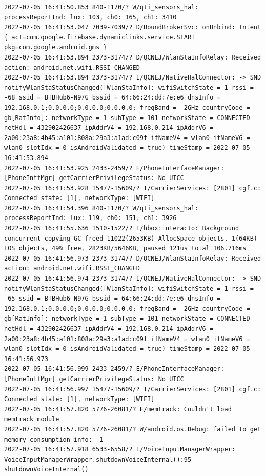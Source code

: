 \documentclass[a4paper,12pt]{book}
\begin{document}
\begin{lstlisting}
2022-07-05 16:41:50.853 840-1170/? W/qti_sensors_hal: processReportInd: lux: 103, ch0: 165, ch1: 3410
2022-07-05 16:41:53.047 7039-7039/? D/BoundBrokerSvc: onUnbind: Intent { act=com.google.firebase.dynamiclinks.service.START pkg=com.google.android.gms }
2022-07-05 16:41:53.894 2373-3174/? D/QCNEJ/WlanStaInfoRelay: Received action: android.net.wifi.RSSI_CHANGED
2022-07-05 16:41:53.894 2373-3174/? I/QCNEJ/NativeHalConnector: -> SND notifyWlanStaStatusChanged([WlanStaInfo]: wifiSwitchState = 1 rssi = -68 ssid = BTBHub6-N97G bssid = 64:66:24:dd:7e:e6 dnsInfo = 192.168.0.1;0.0.0.0;0.0.0.0;0.0.0.0; freqBand = _2GHz countryCode = gb[RatInfo]: networkType = 1 subType = 101 networkState = CONNECTED netHdl = 432902426637 ipAddrV4 = 192.168.0.214 ipAddrV6 = 2a00:23a8:4b45:a101:808a:29a3:a1ad:c09f ifNameV4 = wlan0 ifNameV6 = wlan0 slotIdx = 0 isAndroidValidated = true) timeStamp = 2022-07-05 16:41:53.894
2022-07-05 16:41:53.925 2433-2459/? E/PhoneInterfaceManager: [PhoneIntfMgr] getCarrierPrivilegeStatus: No UICC
2022-07-05 16:41:53.928 15477-15609/? I/CarrierServices: [2801] cgf.c: Connected state: [1], networkType: [WIFI]
2022-07-05 16:41:54.396 840-1170/? W/qti_sensors_hal: processReportInd: lux: 119, ch0: 151, ch1: 3926
2022-07-05 16:41:55.636 1510-1522/? I/hbox:interacto: Background concurrent copying GC freed 11022(2653KB) AllocSpace objects, 1(64KB) LOS objects, 49% free, 2823KB/5646KB, paused 121us total 106.716ms
2022-07-05 16:41:56.973 2373-3174/? D/QCNEJ/WlanStaInfoRelay: Received action: android.net.wifi.RSSI_CHANGED
2022-07-05 16:41:56.974 2373-3174/? I/QCNEJ/NativeHalConnector: -> SND notifyWlanStaStatusChanged([WlanStaInfo]: wifiSwitchState = 1 rssi = -65 ssid = BTBHub6-N97G bssid = 64:66:24:dd:7e:e6 dnsInfo = 192.168.0.1;0.0.0.0;0.0.0.0;0.0.0.0; freqBand = _2GHz countryCode = gb[RatInfo]: networkType = 1 subType = 101 networkState = CONNECTED netHdl = 432902426637 ipAddrV4 = 192.168.0.214 ipAddrV6 = 2a00:23a8:4b45:a101:808a:29a3:a1ad:c09f ifNameV4 = wlan0 ifNameV6 = wlan0 slotIdx = 0 isAndroidValidated = true) timeStamp = 2022-07-05 16:41:56.973
2022-07-05 16:41:56.999 2433-2459/? E/PhoneInterfaceManager: [PhoneIntfMgr] getCarrierPrivilegeStatus: No UICC
2022-07-05 16:41:56.997 15477-15609/? I/CarrierServices: [2801] cgf.c: Connected state: [1], networkType: [WIFI]
2022-07-05 16:41:57.820 5776-26081/? E/memtrack: Couldn't load memtrack module
2022-07-05 16:41:57.820 5776-26081/? W/android.os.Debug: failed to get memory consumption info: -1
2022-07-05 16:41:57.918 6533-6558/? I/VoiceInputManagerWrapper: VoiceInputManagerWrapper.shutdownVoiceInternal():95 shutdownVoiceInternal()

\end{lstlisting}
\end{document}
